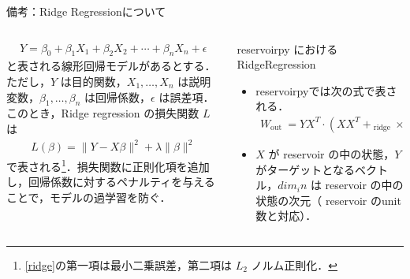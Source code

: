 \begin{frame}{備考：Ridge Regressionについて}
  \begin{columns}[T] %
    \begin{column}{.5\textwidth}
      \begin{align}
        Y=\beta_0+\beta_1 X_1+\beta_2 X_2+\cdots+\beta_n X_n+\epsilon
      \end{align}
       と表される線形回帰モデルがあるとする．ただし，$Y$ は目的関数，$X_1, \ldots, X_n$ は説明変数，$\beta_1, \ldots, \beta_n$ は回帰係数，$\epsilon$ は誤差項．
       このとき，Ridge regression の損失関数 $L$ は
       \begin{align}
        L(\beta)=\|Y-X \beta\|^2+\lambda\|\beta\|^2 \label{ridge}
       \end{align}
       で表される\footnote{\tiny{\eqref{ridge}の第一項は最小二乗誤差，第二項は $L_2$ ノルム正則化．}}．損失関数に正則化項を追加し，回帰係数に対するペナルティを与えることで，モデルの過学習を防ぐ．
    \end{column}
    \begin{column}{.5\textwidth}
      \begin{block}{reservoirpy における RidgeRegression}
        \begin{itemize}
          \item reservoirpyでは次の式で表される．
          \begin{align}
            W_{\text {out }}=Y X^T \cdot\left(X X^T+{ }_{\text {ridge }} \times \operatorname{Id}_{d i m_i n}\right)
          \end{align}
          \item $X$ が reservoir の中の状態，$Y$ がターゲットとなるベクトル，$d i m_i n$ は reservoir の中の状態の次元（ reservoir のunit 数と対応）．
        \end{itemize}
      \end{block}
    
    \end{column}
  \end{columns}
\end{frame}

